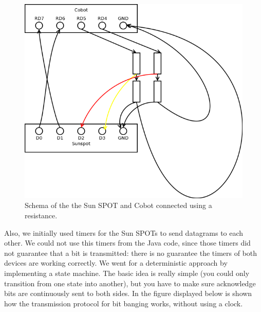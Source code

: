 \documentclass[a4paper,10pt]{article} %
\begin{document}
\begin{figure}[H]
\label{fig:connection-schema}
\centering
\includegraphics[scale=0.5]{img/connection-schema.png}
\caption{Schema of the the Sun SPOT and Cobot connected using a resistance.}
\end{figure}

Also, we initially used timers for the Sun SPOTs to send datagrams to each
other. We could not use this timers from the Java code, since those timers did
not guarantee that a bit is transmitted: there is no guarantee the timers of
both devices are working correctly. We went for a deterministic approach by
implementing a state machine. The basic idea is really simple (you could only
transition from one state into another), but you have to make sure acknowledge
bits are continuously sent to both sides. In the figure displayed below is
shown how the transmission protocol for bit banging works, without using a
clock.
\end{document}
